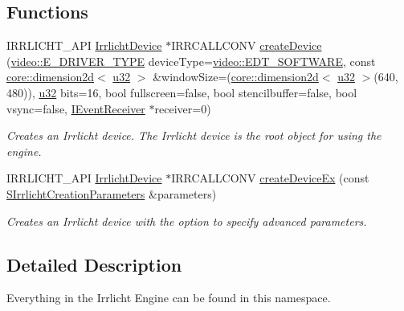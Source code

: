 \subsection*{Functions}
\begin{DoxyCompactItemize}
\item 
I\+R\+R\+L\+I\+C\+H\+T\+\_\+\+A\+PI \hyperlink{classirr_1_1IrrlichtDevice}{Irrlicht\+Device} $\ast$I\+R\+R\+C\+A\+L\+L\+C\+O\+NV \hyperlink{namespaceirr_a57653fdaf6b2746b141ba2bb07d8bba6}{create\+Device} (\hyperlink{namespaceirr_1_1video_ae35a6de6d436c76107ad157fe42356d0}{video\+::\+E\+\_\+\+D\+R\+I\+V\+E\+R\+\_\+\+T\+Y\+PE} device\+Type=\hyperlink{namespaceirr_1_1video_ae35a6de6d436c76107ad157fe42356d0ad863d9225d42c1f9ea1eb7ad89a712ce}{video\+::\+E\+D\+T\+\_\+\+S\+O\+F\+T\+W\+A\+RE}, const \hyperlink{classirr_1_1core_1_1dimension2d}{core\+::dimension2d}$<$ \hyperlink{namespaceirr_a0416a53257075833e7002efd0a18e804}{u32} $>$ \&window\+Size=(\hyperlink{classirr_1_1core_1_1dimension2d}{core\+::dimension2d}$<$ \hyperlink{namespaceirr_a0416a53257075833e7002efd0a18e804}{u32} $>$(640, 480)), \hyperlink{namespaceirr_a0416a53257075833e7002efd0a18e804}{u32} bits=16, bool fullscreen=false, bool stencilbuffer=false, bool vsync=false, \hyperlink{classirr_1_1IEventReceiver}{I\+Event\+Receiver} $\ast$receiver=0)
\begin{DoxyCompactList}\small\item\em Creates an Irrlicht device. The Irrlicht device is the root object for using the engine. \end{DoxyCompactList}\item 
I\+R\+R\+L\+I\+C\+H\+T\+\_\+\+A\+PI \hyperlink{classirr_1_1IrrlichtDevice}{Irrlicht\+Device} $\ast$I\+R\+R\+C\+A\+L\+L\+C\+O\+NV \hyperlink{namespaceirr_ae0a823eb5404bbf156965e7051798496}{create\+Device\+Ex} (const \hyperlink{structirr_1_1SIrrlichtCreationParameters}{S\+Irrlicht\+Creation\+Parameters} \&parameters)
\begin{DoxyCompactList}\small\item\em Creates an Irrlicht device with the option to specify advanced parameters. \end{DoxyCompactList}\end{DoxyCompactItemize}


\subsection{Detailed Description}
Everything in the Irrlicht Engine can be found in this namespace. 

